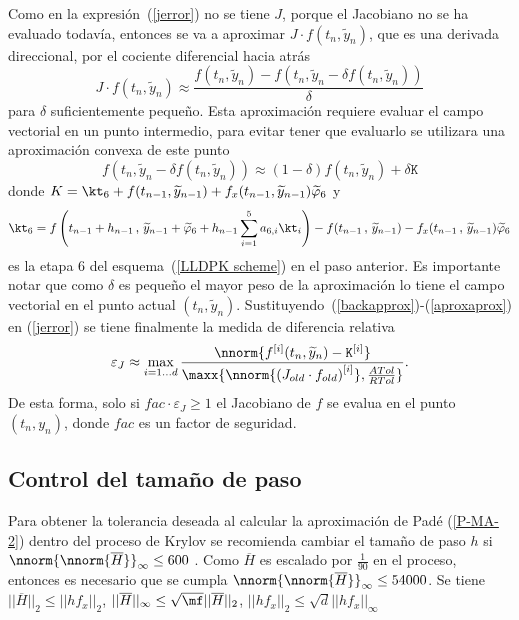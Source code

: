 Como en la expresi\'on~(\ref{jerror}) no se tiene $J$, porque el Jacobiano no se ha evaluado todav\'ia, entonces 
se va a aproximar $J\cdot f(t_n,\widetilde{y}_n)$, que es una derivada direccional, por el cociente diferencial hacia atr\'as
\begin{equation}\label{backapprox}
 J\cdot f(t_n,\widetilde{y}_n) \approx \frac{f(t_n,\widetilde{y}_n) -
 	f\left(t_n,\widetilde{y}_n-\delta f(t_n,\widetilde{y}_n)\right)}{\delta}
\end{equation}
para $\delta$ suficientemente peque\~no. Esta aproximaci\'on requiere evaluar el campo vectorial
en un punto intermedio, para evitar tener que evaluarlo se utilizara una aproximaci\'on convexa de este punto
\begin{equation}\label{aproxaprox}
  f\left(t_n,\widetilde{y}_n-\delta f(t_n,\widetilde{y}_n)\right) \approx 
  (1-\delta) f(t_n,\widetilde{y}_n)+ \delta \mathtt{K}
\end{equation}
donde $K = \kt_{6} + f(t_{n-1},\widetilde{y}_{n-1}) + f_x(t_{n-1},\widetilde{y}_{n-1})\widetilde{\varphi}_{6} $ y
\[ \kt_6 = f\left( t_{n-1}+h_{n-1}\, , \, \widetilde{y}_{n-1}+\widetilde{\varphi}_6+h_{n-1} \sum_{i=1}^{5}a_{6,i}\kt_i \right) - f(t_{n-1}\, ,\, \widetilde{y}_{n-1}) - f_x(t_{n-1}\, , \, \widetilde{y}_{n-1})\widetilde{\varphi}_6 \]
 es la etapa $6$ del esquema~(\ref{LLDPK scheme}) en el paso anterior. Es importante notar que como $\delta$
es peque\~no el mayor peso de la aproximaci\'on lo tiene el campo vectorial en el punto actual $(t_n,\widetilde{y}_n)$. Sustituyendo~(\ref{backapprox})-(\ref{aproxaprox}) en (\ref{jerror}) se tiene finalmente la medida de diferencia relativa 
\begin{equation}\label{jerroraprox}
\varepsilon_J\approx \max_{i=1\ldots d}\frac{\nnorm{f^{[i]}(t_n,\widetilde{y}_n) - \mathtt{K}^{[i]} }}
{\maxx{\nnorm{ \left(J_{old}\cdot f_{old}\right)^{[i]} } ,\frac{ATol}{RTol}}}.
\end{equation}
De esta forma, solo si $fac \cdot \varepsilon_J \geq 1$ el Jacobiano de $f$ se evalua en el punto $(t_n,y_n)$, donde $fac$ es un factor de seguridad. 

\subsection{Control del tama\~no de paso}\label{hcontrol}
Para obtener la tolerancia deseada al calcular la aproximación de Pad\'e (\ref{P-MA-2}) dentro del proceso de Krylov se recomienda
cambiar el tama\~no de paso $h$ si $\nnorm{\nnorm{ \overline{H} }}_\infty\leq 600$ \cite{Jimenez14AMC}. Como $\overline{H}$ es escalado por $\frac{1}{90}$
en el proceso, entonces es necesario que se cumpla $\nnorm{\nnorm{ \overline{H} }}_\infty\leq 54000$. Se tiene
 $|| \overline{H} ||_2\leq || hf_x ||_2$, $|| \overline{H} ||_\infty\leq \sqrt{\mf}||\overline{H}||_2$, 
 $||hf_x||_2\leq \sqrt{d} ||hf_x||_\infty$
 
